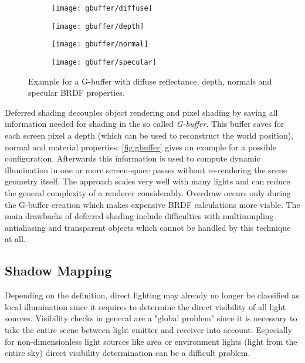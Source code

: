 \documentclass[thesis.tex]{subfiles}
\begin{document}
\begin{figure}[h]
\centering
\begin{subfigure}[b]{0.24\textwidth}
	\texttt{[image: gbuffer/diffuse]}
\end{subfigure}
\begin{subfigure}[b]{0.24\textwidth}
	\texttt{[image: gbuffer/depth]}
\end{subfigure}
\begin{subfigure}[b]{0.24\textwidth}
	\texttt{[image: gbuffer/normal]}
\end{subfigure}
\begin{subfigure}[b]{0.24\textwidth}
	\texttt{[image: gbuffer/specular]}
\end{subfigure}
\caption{Example for a G-buffer with diffuse reflectance, depth, normals and specular BRDF properties.} \label{fig:gbuffer}
\end{figure}
Deferred shading decouples object rendering and pixel shading by saving all information needed for shading in the so called \emph{G-buffer}.
This buffer saves for each screen pixel a depth (which can be used to reconstruct the world position), normal and material properties.
\autoref{fig:gbuffer} gives an example for a possible configuration.
Afterwards this information is used to compute dynamic illumination in one or more screen-space passes without re-rendering the scene geometry itself.
The approach scales very well with many lights and can reduce the general complexity of a renderer considerably.
Overdraw occurs only during the G-buffer creation which makes expensive BRDF calculations more viable.
The main drawbacks of deferred shading include difficulties with multisampling-antialiasing and transparent objects which cannot be handled by this technique at all.


\subsection{Shadow Mapping}
Depending on the definition, direct lighting may already no longer be classified as local illumination since it requires to determine the direct visibility of all light sources. 
Visibility checks in general are a "global problem" since it is necessary to take the entire scene between light emitter and receiver into account.
Especially for non-dimensionless light sources like area or environment lights (light from the entire sky) direct visibility determination can be a difficult problem.
\end{document}

